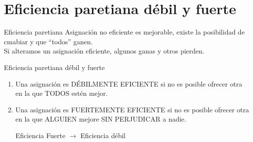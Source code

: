 \section[Eficiencia]{Eficiencia paretiana débil y fuerte}

\begin{frame}{Eficiencia paretiana}
	Asignación no eficiente es mejorable, existe la posibilidad de cmabiar y que ``todos'' ganen.\\
		\bigskip
	Si alteramos un asignación eficiente, algunos ganas y otros pierden.
\end{frame}
\begin{frame}{Eficiencia paretiana débil y fuerte}
	\begin{enumerate}
		\item Una asignación es DÉBILMENTE EFICIENTE si no es posible ofrecer otra en la que TODOS estén mejor.
		\item Una asignación es FUERTEMENTE EFICIENTE  si no es posible ofrecer otra en la que ALGUIEN mejore SIN PERJUDICAR  a nadie.
			\begin{center}
				Eficiencia Fuerte $\longrightarrow$ Eficiencia débil
			\end{center}
	\end{enumerate}
\end{frame}